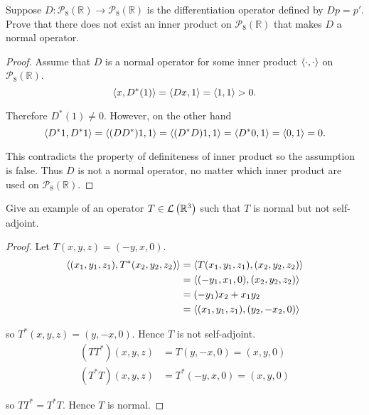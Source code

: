 \begin{exercise}
    Suppose $D: \mathscr{P}_{8}(\mathbb{R}) \to \mathscr{P}_{8}(\mathbb{R})$ is the differentiation operator defined by $Dp = p'$. Prove that there does not exist an inner product on $\mathscr{P}_{8}(\mathbb{R})$ that makes $D$ a normal operator.
\end{exercise}

\begin{proof}
    Assume that $D$ is a normal operator for some inner product $\left\langle{\cdot, \cdot}\right\rangle$ on $\mathscr{P}_{8}(\mathbb{R})$.
    \[
        \left\langle{x, D^{*}(1)}\right\rangle = \left\langle{Dx, 1}\right\rangle = \left\langle{1, 1}\right\rangle > 0.
    \]

    Therefore $D^{*}(1)\ne 0$. However, on the other hand
    \[
        \left\langle{D^{*}1, D^{*}1}\right\rangle = \left\langle{(DD^{*})1, 1}\right\rangle = \left\langle{(D^{*}D)1, 1}\right\rangle = \left\langle{D^{*}0, 1}\right\rangle = \left\langle{0, 1}\right\rangle = 0.
    \]

    This contradicts the property of definiteness of inner product so the assumption is false. Thus $D$ is not a normal operator, no matter which inner product are used on $\mathscr{P}_{8}(\mathbb{R})$.
\end{proof}
\newpage

\begin{exercise}
    Give an example of an operator $T\in\mathcal{L}\left({\mathbb{R}^{3}}\right)$ such that $T$ is normal but not self-adjoint.
\end{exercise}

\begin{proof}
    Let $T(x, y, z) = (-y, x, 0)$.
    \begin{align*}
        \left\langle{(x_{1}, y_{1}, z_{1}), T^{*}(x_{2}, y_{2}, z_{2})}\right\rangle & = \left\langle{T(x_{1}, y_{1}, z_{1}), (x_{2}, y_{2}, z_{2})}\right\rangle \\
        & = \left\langle{(-y_{1}, x_{1}, 0), (x_{2}, y_{2}, z_{2})}\right\rangle \\
        & = (-y_{1})x_{2} + x_{1}y_{2} \\
        & = \left\langle{(x_{1}, y_{1}, z_{1}), (y_{2}, -x_{2}, 0)}\right\rangle
    \end{align*}

    so $T^{*}(x, y, z) = (y, -x, 0)$. Hence $T$ is not self-adjoint.
    \begin{align*}
        (TT^{*})(x, y, z) & = T(y, -x, 0) = (x, y, 0) \\
        (T^{*}T)(x, y, z) & = T^{*}(-y, x, 0) = (x, y, 0)
    \end{align*}

    so $TT^{*} = T^{*}T$. Hence $T$ is normal.
\end{proof}
\newpage

